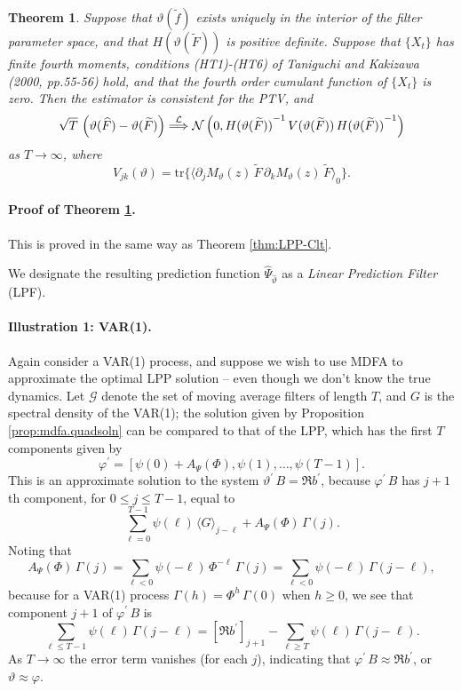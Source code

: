 \documentclass[a4paper]{book}
\def\convinlaw{\stackrel{{\cal L}}{\Longrightarrow }}
\def\tends{\rightarrow}
\newtheorem{Theorem}{Theorem}
\begin{document}
\begin{Theorem} 
\label{thm:MDFAasymp}
 Suppose that $\vartheta (\widetilde{f})$ exists uniquely in the
 interior of the filter parameter space, and that
 $H(\vartheta (\widetilde{F}))$ is 
 positive definite.  Suppose that $\{ X_t \}$ has finite fourth moments, 
conditions (HT1)-(HT6) of Taniguchi and Kakizawa (2000, pp.55-56)
 hold, and that the fourth order cumulant function of $\{ X_t \}$ is zero.  
 Then the estimator is consistent for the PTV, and
\[
 \sqrt{T} \, \left( \vartheta( \widehat{F} ) - \vartheta (\widetilde{F}) \right) 
 \convinlaw \mathcal{N} \left( 0, { H(\vartheta (\widetilde{F})) }^{-1} \, V (\vartheta (\widetilde{F})) \, { H(\vartheta (\widetilde{F})) }^{-1} \right)
\]
 as $T \tends \infty$, where 
\[
  V_{jk} (\vartheta) =  \mbox{tr} \{ { \langle  \partial_j M_{\vartheta} (z) \, \widetilde{F} \,
 \partial_k M_{\vartheta} (z) \, \widetilde{F} \rangle }_0 \}.
\]
\end{Theorem}

\paragraph{Proof of Theorem \ref{thm:MDFAasymp}.}
  This is proved in the same way as Theorem \ref{thm:LPP-Clt}.

\vspace{.5cm}

  We designate the resulting   prediction function
$\widehat{\Psi}_{\widehat{\vartheta}}$  as  a {\em Linear
Prediction Filter} (LPF). 

\paragraph{Illustration 1: VAR(1).}  Again consider a VAR(1) process,
 and suppose we wish to use MDFA to approximate the optimal LPP
 solution -- even though we don't know the true dynamics.
   Let $\mathcal{G}$ denote the set of moving average filters of
 length $T$, and $G$ is the spectral density of the VAR(1);
  the solution given by Proposition \ref{prop:mdfa.quadsoln}
 can be compared to that of the LPP, which has the first $T$ components
 given by
\[
 \varphi^{\prime} = [ \psi (0) + A_{\Psi} (\Phi), \psi (1),
 \ldots, \psi (T-1)].
\]
 This is an approximate solution to the system $\vartheta^{\prime} \, B
 = \Re b^{\prime}$, because
 $  \varphi^{\prime} \, B $ has $j+1$th component, for $0 \leq j \leq T-1$,
 equal to
\[
   \sum_{\ell=0}^{T-1} \psi (\ell) \, {\langle G \rangle }_{j-\ell}
 + A_{\Psi} (\Phi) \, \Gamma (j).
\]
  Noting that
\[
 A_{\Psi} (\Phi) \, \Gamma (j)
 = \sum_{\ell < 0 } \psi (-\ell) \, \Phi^{-\ell} \, \Gamma (j)
 = \sum_{\ell < 0} \psi (-\ell) \, \Gamma (j- \ell),
\]
 because for a VAR(1) process $\Gamma (h) = \Phi^h \, \Gamma (0)$ when
 $h \geq 0$, we see that component $j+1$ of $\varphi^{\prime} \, B$ is
\[
  \sum_{\ell \leq T-1} \psi (\ell) \, \Gamma (j-\ell)
  =  {[ \Re b^{\prime} ]}_{j+1} - \sum_{\ell \geq T} \psi (\ell) \, \Gamma (j-\ell).
\]
 As $T \tends \infty$ the error term vanishes (for each $j$), indicating
 that $\varphi^{\prime} \, B \approx \Re b^{\prime}$, or
 $\vartheta \approx \varphi$.
\end{document}
